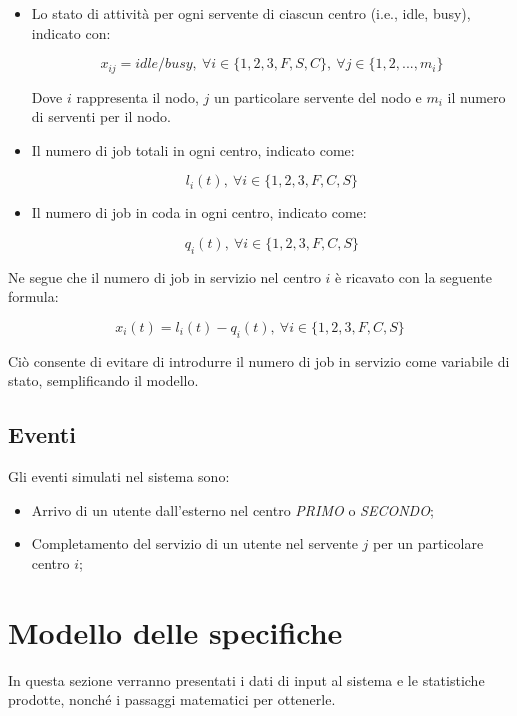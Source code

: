\documentclass{article}
\begin{document}
\begin{itemize}
\item Lo stato di attività per ogni servente di ciascun centro (i.e., idle, busy), indicato con:
\begin{center}
\[x_{ij} = idle/busy,\ \forall i\in\{1,2,3,F,S,C\},\ \forall j\in\{1,2,...,m_i\}\]
\end{center}
Dove $i$ rappresenta il nodo, $j$ un particolare servente del nodo e $m_i$ il numero di serventi per il nodo.

\item Il numero di job totali in ogni centro, indicato come: 
\begin{center}
\[l_i(t),\ \forall i \in \{1,2,3,F,C,S\}\]
\end{center}

\item Il numero di job in coda in ogni centro, indicato come:
\begin{center}
\[q_i(t),\ \forall i \in \{1,2,3,F,C,S\}\]
\end{center}
\end{itemize}

Ne segue che il numero di job in servizio nel centro $i$ è ricavato con la seguente formula:
\begin{center}
\[x_i(t) = l_i(t) - q_i(t),\ \forall i \in \{1,2,3,F,C,S\}\]
\end{center}

Ciò consente di evitare di introdurre il numero di job in servizio come variabile di stato, semplificando il modello.

\subsection{Eventi}\label{subsec:eventi}

Gli eventi simulati nel sistema sono: 

\begin{itemize}
    \item Arrivo di un utente dall'esterno nel centro \textit{PRIMO} o \textit{SECONDO};
    \item Completamento del servizio di un utente nel servente $j$ per un particolare centro $i$; 
\end{itemize}

\section{Modello delle specifiche}\label{sec:specifiche}
In questa sezione verranno presentati i dati di input al sistema e le statistiche prodotte, nonché i passaggi matematici per ottenerle.
\end{document}
